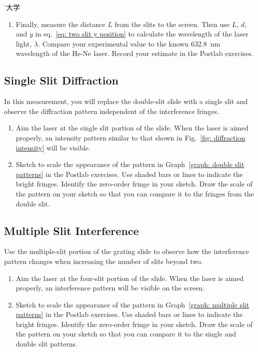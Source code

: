 ’大学\documentclass[addpoints]{physlabs}
\begin{document}
\begin{labsection}
\begin{experiment}
\begin{enumerate}
        \item Finally, measure the distance $L$ from the slits to the screen. Then use $L$, $d$, and $y$ in eq.~\ref{eq: two slit y position} to calculate the wavelength of the laser light, $\lambda$. Compare your experimental value to the known \qty{632.8}{\nano\meter} wavelength of the He-Ne laser. Record your estimate in the Postlab exercises.

    \end{enumerate}

    \subsection*{Single Slit Diffraction}

    In this measurement, you will replace the double-slit slide with a single slit and observe the diffraction pattern independent of the interference fringes.

    \begin{enumerate}
        \item Aim the laser at the single slit portion of the slide. When the laser is aimed properly, an intensity pattern similar to that shown in Fig.~\ref{fig: diffraction intensity} will be visible.

        \item Sketch to scale the appearance of the pattern in Graph~\ref{graph: double slit patterns} in the Postlab exercises. Use shaded bars or lines to indicate the bright fringes. Identify the zero-order fringe in your sketch. Draw the scale of the pattern on your sketch so that you can compare it to the fringes from the double slit.
    \end{enumerate}

    \subsection*{Multiple Slit Interference}

    Use the multiple-slit portion of the grating slide to observe how the interference pattern changes when increasing the number of slits beyond two.

    \begin{enumerate}
        \item Aim the laser at the four-slit portion of the slide. When the laser is aimed properly, an interference pattern will be visible on the screen.

        \item Sketch to scale the appearance of the pattern in Graph~\ref{graph: multiple slit patterns} in the Postlab exercises. Use shaded bars or lines to indicate the bright fringes. Identify the zero-order fringe in your sketch. Draw the scale of the pattern on your sketch so that you can compare it to the single and double slit patterns.


\end{enumerate}
\end{experiment}
\end{labsection}
\end{document}
